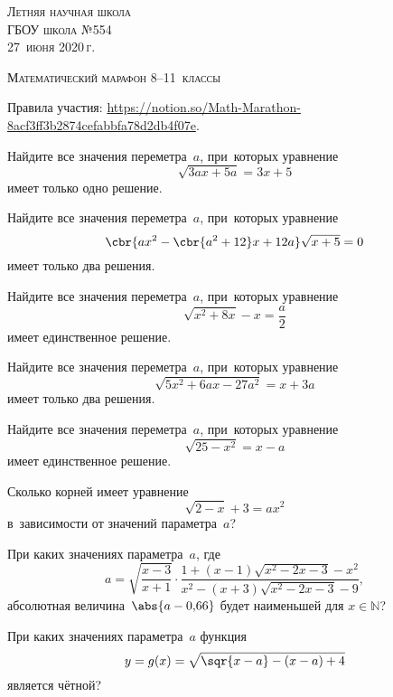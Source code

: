 
\narrow

\renewcommand{\theenumi}{\asbuk{enumi}}
\renewcommand{\labelenumi}{\asbuk{enumi})}


\begin{flushright}
\textsc{Летняя научная школа \\ ГБОУ школа №554 \\ 27~июня 2020\,г.}
\end{flushright}

\begin{center}
\LARGE \textsc{Математический марафон}
\LARGE \textsc{8–11~классы}
\end{center}

Правила участия: \href{https://www.notion.so/Math-Marathon-8acf3ff3b2874cefabbfa78d2db4f07e}{https://notion.so/Math-Marathon-8acf3ff3b2874cefabbfa78d2db4f07e}.

%
Найдите все значения переметра~$a$, при~которых уравнение 
$$\sqrt{3ax + 5a} = 3x + 5$$
имеет только одно решение.

%
Найдите все значения переметра~$a$, при~которых уравнение
$$\cbr{ax^2 - \cbr{a^2+12}x + 12a}\sqrt{x+5} = 0$$
имеет только два решения.

%
Найдите все значения переметра~$a$, при~которых уравнение 
$$\sqrt{x^2 + 8x} - x = \frac a2$$
имеет единственное решение.

%
Найдите все значения переметра~$a$, при~которых уравнение 
$$\sqrt{5x^2 + 6ax - 27a^2} = x + 3a$$
имеет только два решения.

%
Найдите все значения переметра~$a$, при~которых уравнение 
$$\sqrt{25-x^2} = x - a$$
имеет единственное решение.

%
Сколько корней имеет уравнение 
$$\sqrt{2-x} + 3 = ax^2$$
в~зависимости от значений параметра~$a$?

%
При каких значениях параметра~$a$, где 
$$a=\sqrt{\frac{x-3}{x+1}}\cdot\frac{1+(x-1)\sqrt{x^2-2x-3} - x^2}{x^2-(x+3)\sqrt{x^2 - 2x - 3} - 9},$$
абсолютная величина~$\abs{a-0{,}66}$ будет наименьшей для $x\in\mathbb{N}$?

%
При каких значениях параметра~$a$ функция 
$$y=g(x) = \sqrt{\sqr{x-a} - (x-a) + 4}$$
является чётной?

